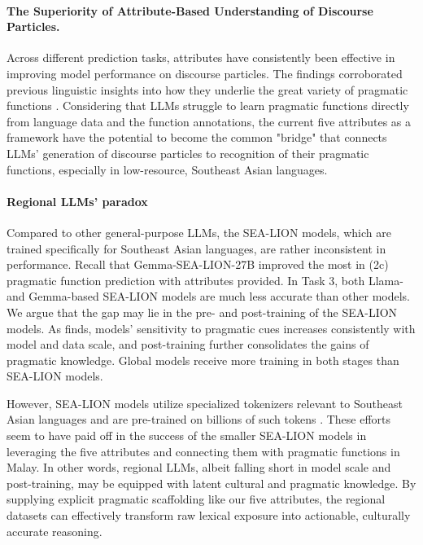 \documentclass[11pt]{article}
\begin{document}
\paragraph{The Superiority of Attribute-Based Understanding of Discourse Particles.}
Across different prediction tasks, attributes have consistently been effective in improving model performance on discourse particles. The findings corroborated previous linguistic insights into how they underlie the great variety of pragmatic functions \cite{wouk1998solidarity, stalnaker2002common, karkkainen2003epistemic, caffi1994pragmatics}. Considering that LLMs struggle to learn pragmatic functions directly from language data and the function annotations, the current five attributes as a framework have the potential to become the common "bridge" that connects LLMs' generation of discourse particles to recognition of their pragmatic functions, especially in low-resource, Southeast Asian languages. 

\paragraph{Regional LLMs' paradox}
Compared to other general-purpose LLMs, the SEA-LION models, which are trained specifically for Southeast Asian languages, are rather inconsistent in performance. Recall that Gemma-SEA-LION-27B improved the most in (2c) pragmatic function prediction with attributes provided. In Task 3, both Llama- and Gemma-based SEA-LION models are much less accurate than other models. We argue that the gap may lie in the pre- and post-training of the SEA-LION models. As \citet{yu-etal-2026-pragmatic} finds, models' sensitivity to pragmatic cues increases consistently with model and data scale, and post-training further consolidates the gains of pragmatic knowledge. Global models receive more training in both stages than SEA-LION models. 

However, SEA-LION models utilize specialized tokenizers relevant to Southeast Asian languages and are pre-trained on billions of such tokens \citep{ng2025sea,koh2025mitigating}. These efforts seem to have paid off in the success of the smaller SEA-LION models in leveraging the five attributes and connecting them with pragmatic functions in Malay. In other words, regional LLMs, albeit falling short in model scale and post-training, may be equipped with latent cultural and pragmatic knowledge. By supplying explicit pragmatic scaffolding like our five attributes, the regional datasets can effectively transform raw lexical exposure into actionable, culturally accurate reasoning.
\end{document}
